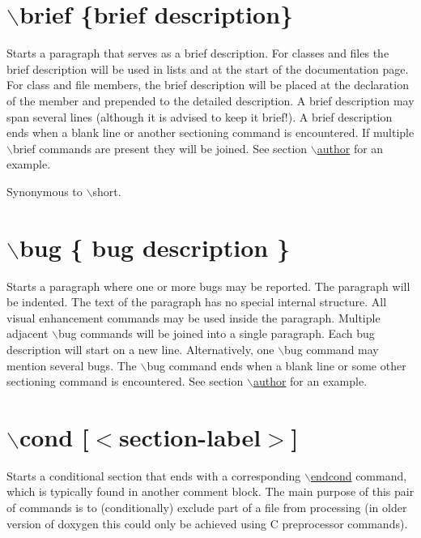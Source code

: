  \hypertarget{commands_cmdbrief}{}\section{$\backslash$brief \{brief description\}}\label{commands_cmdbrief}
 Starts a paragraph that serves as a brief description. For classes and files the brief description will be used in lists and at the start of the documentation page. For class and file members, the brief description will be placed at the declaration of the member and prepended to the detailed description. A brief description may span several lines (although it is advised to keep it brief!). A brief description ends when a blank line or another sectioning command is encountered. If multiple $\backslash$brief commands are present they will be joined. See section \hyperlink{commands_cmdauthor}{$\backslash$author} for an example.

Synonymous to $\backslash$short.



 \hypertarget{commands_cmdbug}{}\section{$\backslash$bug \{ bug description \}}\label{commands_cmdbug}
 Starts a paragraph where one or more bugs may be reported. The paragraph will be indented. The text of the paragraph has no special internal structure. All visual enhancement commands may be used inside the paragraph. Multiple adjacent $\backslash$bug commands will be joined into a single paragraph. Each bug description will start on a new line. Alternatively, one $\backslash$bug command may mention several bugs. The $\backslash$bug command ends when a blank line or some other sectioning command is encountered. See section \hyperlink{commands_cmdauthor}{$\backslash$author} for an example.



 \hypertarget{commands_cmdcond}{}\section{$\backslash$cond \mbox{[}$<$section-label$>$\mbox{]}}\label{commands_cmdcond}
 Starts a conditional section that ends with a corresponding \hyperlink{commands_cmdendcond}{$\backslash$endcond} command, which is typically found in another comment block. The main purpose of this pair of commands is to (conditionally) exclude part of a file from processing (in older version of doxygen this could only be achieved using C preprocessor commands).

